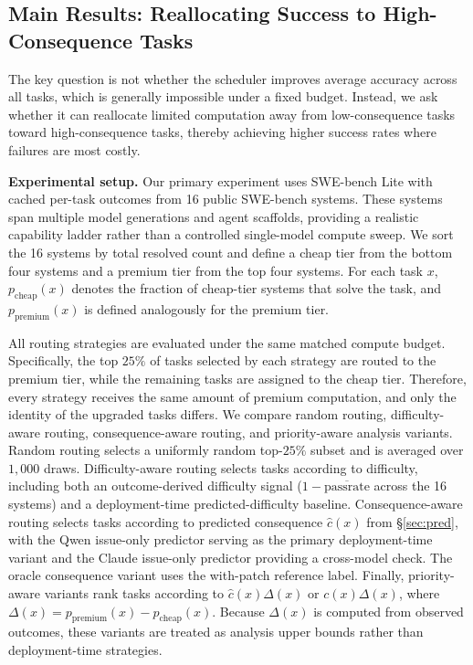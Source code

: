 \documentclass{article}
\begin{document}
\subsection{Main Results: Reallocating Success to High-Consequence Tasks}
\label{sec:main}

The key question is not whether the scheduler improves average accuracy across all tasks, which is generally impossible under a fixed budget. Instead, we ask whether it can reallocate limited computation away from low-consequence tasks toward high-consequence tasks, thereby achieving higher success rates where failures are most costly.

\textbf{Experimental setup.}
Our primary experiment uses SWE-bench Lite with cached per-task outcomes from 16 public SWE-bench systems. These systems span multiple model generations and agent scaffolds, providing a realistic capability ladder rather than a controlled single-model compute sweep. We sort the 16 systems by total resolved count and define a cheap tier from the bottom four systems and a premium tier from the top four systems. For each task $x$, $p_{\mathrm{cheap}}(x)$ denotes the fraction of cheap-tier systems that solve the task, and $p_{\mathrm{premium}}(x)$ is defined analogously for the premium tier.

All routing strategies are evaluated under the same matched compute budget. Specifically, the top $25\%$ of tasks selected by each strategy are routed to the premium tier, while the remaining tasks are assigned to the cheap tier. Therefore, every strategy receives the same amount of premium computation, and only the identity of the upgraded tasks differs. We compare random routing, difficulty-aware routing, consequence-aware routing, and priority-aware analysis variants. Random routing selects a uniformly random top-$25\%$ subset and is averaged over $1{,}000$ draws. Difficulty-aware routing selects tasks according to difficulty, including both an outcome-derived difficulty signal ($1-\overline{\mathrm{passrate}}$ across the 16 systems) and a deployment-time predicted-difficulty baseline. Consequence-aware routing selects tasks according to predicted consequence $\hat{c}(x)$ from \S\ref{sec:pred}, with the Qwen issue-only predictor serving as the primary deployment-time variant and the Claude issue-only predictor providing a cross-model check. The oracle consequence variant uses the with-patch reference label. Finally, priority-aware variants rank tasks according to $\hat{c}(x)\Delta(x)$ or $c(x)\Delta(x)$, where $\Delta(x)=p_{\mathrm{premium}}(x)-p_{\mathrm{cheap}}(x)$. Because $\Delta(x)$ is computed from observed outcomes, these variants are treated as analysis upper bounds rather than deployment-time strategies.
\end{document}
